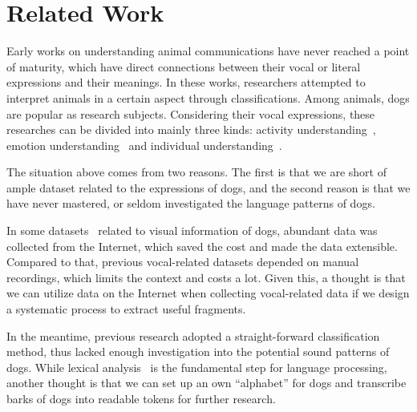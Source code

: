 \section{Related Work}
\label{sec:related}
Early works on understanding animal communications have never reached a point of maturity, which have direct connections between their vocal or literal expressions and their meanings. In these works, researchers attempted to interpret animals in a certain aspect through classifications. Among animals, dogs are popular as research subjects.  Considering their vocal expressions, these researches can be divided into mainly three kinds: activity understanding~\cite{ide2021rescue, ehsani2018let, molnar2008classification}, emotion understanding~\cite{hantke2018my, paladini2020bark} and individual understanding~\cite{larranaga2015comparing}. 

The situation above comes from two reasons. The first is that we are short of ample dataset related to the expressions of dogs, and the second reason is that we have never mastered, or seldom investigated the language patterns of dogs.

In some datasets~\cite{parkhi2012cats, iwashita2014first, abu2016youtube} related to visual information of dogs, abundant data was collected from the Internet, which saved the cost and made the data extensible. Compared to that, previous vocal-related datasets depended on manual recordings, which limits the context and costs a lot. Given this, a thought is that we can utilize data on the Internet when collecting vocal-related data if we design a systematic process to extract useful fragments.

In the meantime, previous research adopted a straight-forward classification method, thus lacked enough investigation into the potential sound patterns of dogs. While lexical analysis~\cite{yule2022study} is the fundamental step for language processing, another thought is that we can set up an own  ``alphabet'' for dogs and transcribe barks of dogs into readable tokens for further research.
